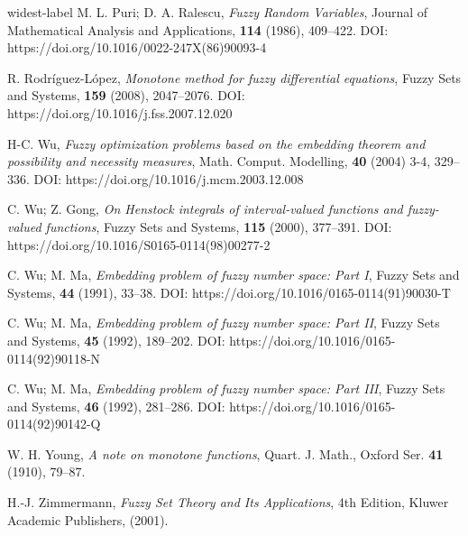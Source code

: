 \documentclass{amsart}
\begin{document}
\begin{thebibliography}{widest-label}
 M. L. Puri; D. A. Ralescu,  \textit{Fuzzy Random Variables}, Journal of Mathematical  Analysis and Applications, {\bf 114}  (1986), 409--422.
DOI: https://doi.org/10.1016/0022-247X(86)90093-4

 R. Rodr\'iguez-L\'opez,  \textit{Monotone method for fuzzy differential equations}, Fuzzy Sets and Systems, {\bf 159}  (2008), 2047--2076. 
DOI: https://doi.org/10.1016/j.fss.2007.12.020


 H-C. Wu, \textit{Fuzzy optimization problems based on the embedding theorem and possibility and necessity measures},
  Math. Comput. Modelling, \textbf{40} (2004) 3-4, 329--336.
DOI: https://doi.org/10.1016/j.mcm.2003.12.008

C. Wu; Z. Gong,
\textit{On Henstock integrals of interval-valued functions and fuzzy-valued
functions},
Fuzzy Sets and Systems, \textbf{115} (2000),  377--391.
DOI: https://doi.org/10.1016/S0165-0114(98)00277-2

C. Wu; M. Ma,
\textit{Embedding problem of fuzzy number space: Part I},
Fuzzy Sets and Systems, \textbf{44} (1991),  33--38.
DOI: https://doi.org/10.1016/0165-0114(91)90030-T

C. Wu; M. Ma,
\textit{Embedding problem of fuzzy number space: Part II},
Fuzzy Sets and Systems, \textbf{45} (1992),  189--202.
DOI: https://doi.org/10.1016/0165-0114(92)90118-N


C. Wu; M. Ma,
\textit{Embedding problem of fuzzy number space: Part III},
Fuzzy Sets and Systems, \textbf{46} (1992),  281--286.
DOI: https://doi.org/10.1016/0165-0114(92)90142-Q

 W. H. Young,
\textit{A note on monotone functions}, Quart. J. Math., Oxford Ser. {\bf 41} (1910),
79--87.



H.-J. Zimmermann, \textit{Fuzzy Set Theory and Its Applications},
4th Edition, Kluwer Academic Publishers, (2001).




\end{thebibliography}
\end{document}
